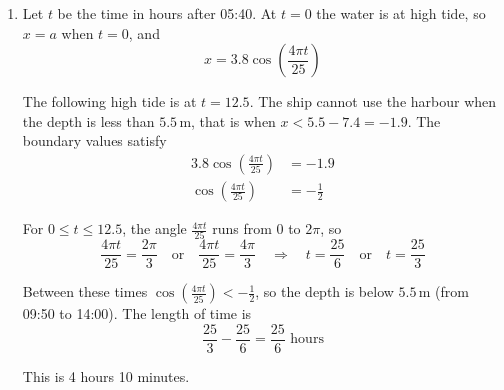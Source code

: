 \documentclass[leqno]{article}
\begin{document}
\begin{enumerate}[
  label=\textbf{\arabic*.},
  leftmargin=*,
  topsep=0pt,
  partopsep=0pt,
  parsep=0pt
]
\begin{djsSolution}
\begin{enumerate}[label=\textbf{(\alph*)}, start=1]
Between high tide and low tide the water level is falling throughout, so the two moments are where the speed is \(1.5\,\mathrm{m\,h^{-1}}\). Substituting \(v=1.5\), \(a=3.8\) and \(\omega=\frac{4\pi}{25}\):
\begin{align*}
1.5^2&=\left(\frac{4\pi}{25}\right)^2\left(3.8^2-x^2\right)\\
x^2&=14.44-\frac{2.25\times625}{16\pi^2}\\
x^2&\approx 5.535\\
x&\approx \pm 2.353
\end{align*}

The depths of water are therefore
\[
7.4+2.353\approx 9.75\,\mathrm{m}\qquad\text{and}\qquad 7.4-2.353\approx 5.05\,\mathrm{m}
\]

  \item Let \(t\) be the time in hours after 05:40. At \(t=0\) the water is at high tide, so \(x=a\) when \(t=0\), and
\[
x=3.8\cos\left(\frac{4\pi t}{25}\right)
\]

The following high tide is at \(t=12.5\). The ship cannot use the harbour when the depth is less than \(5.5\,\mathrm{m}\), that is when \(x<5.5-7.4=-1.9\). The boundary values satisfy
\begin{align*}
3.8\cos\left(\frac{4\pi t}{25}\right)&=-1.9\\
\cos\left(\frac{4\pi t}{25}\right)&=-\frac{1}{2}
\end{align*}

For \(0\le t\le 12.5\), the angle \(\frac{4\pi t}{25}\) runs from \(0\) to \(2\pi\), so
\[
\frac{4\pi t}{25}=\frac{2\pi}{3}\quad\text{or}\quad\frac{4\pi t}{25}=\frac{4\pi}{3}\quad\Longrightarrow\quad t=\frac{25}{6}\quad\text{or}\quad t=\frac{25}{3}
\]

Between these times \(\cos\left(\frac{4\pi t}{25}\right)<-\frac12\), so the depth is below \(5.5\,\mathrm{m}\) (from 09:50 to 14:00). The length of time is
\[
\frac{25}{3}-\frac{25}{6}=\frac{25}{6}\text{ hours}
\]

This is 4 hours 10 minutes.
\end{enumerate}
\end{djsSolution}

\newpage

\questionitem


\end{enumerate}
\end{document}
